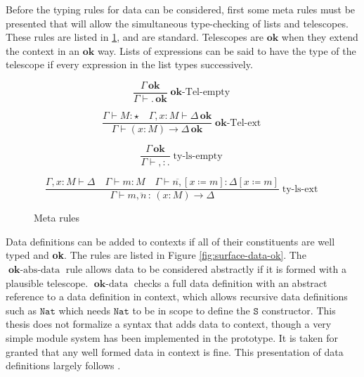 Before the typing rules for data can be considered, first some meta
rules must be presented that will allow the simultaneous type-checking
of lists and telescopes. These rules are listed in \ref{fig:surface-data-meta-ty},
and are standard. Telescopes are $\mathbf{ok}$ when they extend the
context in an $\mathbf{ok}$ way. Lists of expressions can be said
to have the type of the telescope if every expression in the list
types successively.

\begin{figure}
\[
\frac{\Gamma\,\mathbf{ok}}{\Gamma\vdash.\,\mathbf{ok}}\operatorname{\mathbf{ok}-Tel-empty}
\]

\[
\frac{\Gamma\vdash M:\star\quad\Gamma,x:M\vdash\Delta\,\mathbf{ok}}{\Gamma\vdash\left(x:M\right)\rightarrow\Delta\,\mathbf{ok}}\operatorname{\mathbf{ok}-Tel-ext}
\]

\[
\frac{\Gamma\,\mathbf{ok}}{\Gamma\vdash,:.}\operatorname{ty-ls-empty}
\]

\[
\frac{\Gamma,x:M\vdash\Delta\quad\Gamma\vdash m:M\quad\Gamma\vdash\overline{n,}\left[x\coloneqq m\right]:\Delta\left[x\coloneqq m\right]}{\Gamma\vdash m\overline{,n}\,:\,\left(x:M\right)\rightarrow\Delta}\operatorname{ty-ls-ext}
\]

\caption{Meta rules}
\label{fig:surface-data-meta-ty}
\end{figure}

Data definitions can be added to contexts if all of their constituents
are well typed and \textbf{ok}. The rules are listed in Figure \ref{fig:surface-data-ok}.
The $\operatorname{\mathbf{ok}-abs-data}$ rule allows data to be
considered abstractly if it is formed with a plausible telescope.
$\operatorname{\mathbf{ok}-data}$ checks a full data definition with
an abstract reference to a data definition in context, which allows
recursive data definitions such as $\mathtt{Nat}$ which needs $\mathtt{Nat}$
to be in scope to define the $\mathtt{S}$ constructor. This thesis
does not formalize a syntax that adds data to context, though a very
simple module system has been implemented in the prototype. It is
taken for granted that any well formed data in context is fine. This
presentation of data definitions largely follows \cite{sjoberg2012irrelevance}. 


